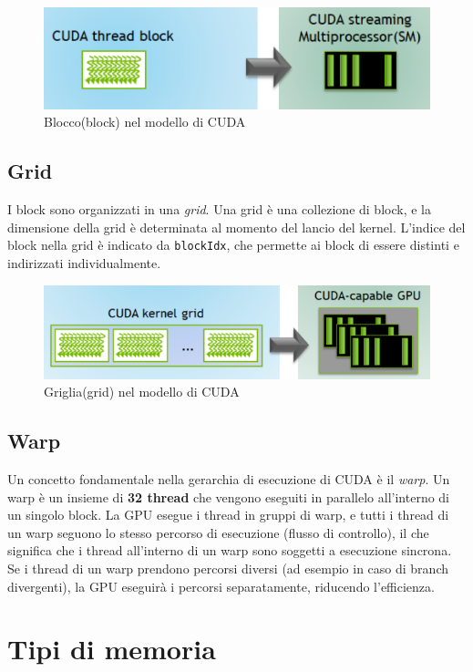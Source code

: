 \documentclass[12pt,a4paper]{report}
\begin{document}
\begin{figure}[h]
    \centering
    \includegraphics[width=0.7\linewidth]{img/cuda_block.png}
    \caption{Blocco(block) nel modello di CUDA \cite{CUDA_blog}}
\end{figure}



\subsection*{Grid}
I block sono organizzati in una \textit{grid}. Una grid è una collezione di block, e la dimensione della grid è determinata al momento del lancio del kernel. L'indice del block nella grid è indicato da \texttt{blockIdx}, che permette ai block di essere distinti e indirizzati individualmente.

\begin{figure}[h]
    \centering
    \includegraphics[width=0.7\linewidth]{img/cuda_grid.png}
    \caption{Griglia(grid) nel modello di CUDA \cite{CUDA_blog}}
\end{figure}



\subsection*{Warp}
Un concetto fondamentale nella gerarchia di esecuzione di CUDA è il \textit{warp}. Un warp è un insieme di \textbf{32 thread} che vengono eseguiti in parallelo all'interno di un singolo block. La GPU esegue i thread in gruppi di warp, e tutti i thread di un warp seguono lo stesso percorso di esecuzione (flusso di controllo), il che significa che i thread all'interno di un warp sono soggetti a esecuzione sincrona. Se i thread di un warp prendono percorsi diversi (ad esempio in caso di branch divergenti), la GPU eseguirà i percorsi separatamente, riducendo l'efficienza.



\section{Tipi di memoria}
\end{document}
